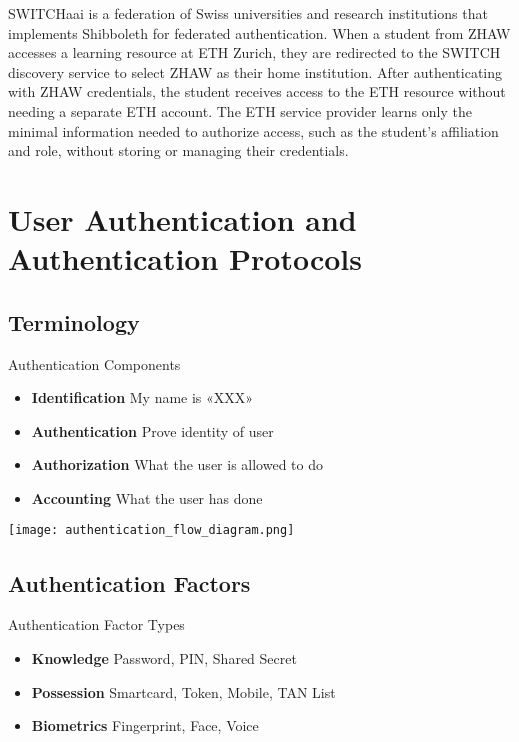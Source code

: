 \begin{example}
SWITCHaai is a federation of Swiss universities and research institutions that implements Shibboleth for federated authentication. When a student from ZHAW accesses a learning resource at ETH Zurich, they are redirected to the SWITCH discovery service to select ZHAW as their home institution. After authenticating with ZHAW credentials, the student receives access to the ETH resource without needing a separate ETH account. The ETH service provider learns only the minimal information needed to authorize access, such as the student's affiliation and role, without storing or managing their credentials.
\end{example}


\section{User Authentication and Authentication Protocols}

\subsection{Terminology}

\begin{definition}{Authentication Components}\\
    \begin{itemize}
        \item \textbf{Identification} My name is «XXX»
        \item \textbf{Authentication} Prove identity of user
        \item \textbf{Authorization} What the user is allowed to do
        \item \textbf{Accounting} What the user has done
    \end{itemize}
\end{definition}

\texttt{[image: authentication\_flow\_diagram.png]}

\subsection{Authentication Factors}

\begin{definition}{Authentication Factor Types}\\
    \begin{itemize}
        \item \textbf{Knowledge} Password, PIN, Shared Secret
        \item \textbf{Possession} Smartcard, Token, Mobile, TAN List
        \item \textbf{Biometrics} Fingerprint, Face, Voice
    \end{itemize}
\end{definition}

